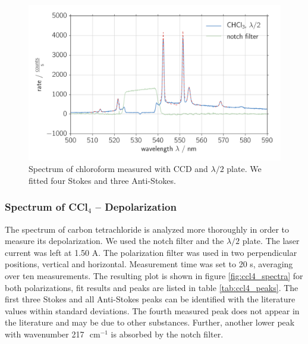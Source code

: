 \begin{figure}[htpb]
    \centering
    \includegraphics[width=0.8\linewidth]{analysis/figures/ccd_chcl3_spectra}
    \caption{
        Spectrum of chloroform measured with CCD and $\lambda / 2$ plate. We fitted four Stokes and 
        three Anti-Stokes. 
    }
    \label{fig:ccd_chcl3_spectra}
\end{figure}

\subsubsection{Spectrum of CCl$_4$ -- Depolarization}
The spectrum of carbon tetrachloride is analyzed more thoroughly in order to measure its depolarization. We used 
the notch filter and the $\lambda / 2$ plate. The laser current was left at 1.50 A. The polarization filter was 
used in two perpendicular positions, vertical and horizontal. Measurement time was set to 20 s, averaging over 
ten measurements. The resulting plot is shown in figure \ref{fig:ccl4_spectra} for both polarizations, fit results 
and peaks are listed in table \ref{tab:ccl4_peaks}. The first three Stokes and all Anti-Stokes peaks can be 
identified with the literature values within standard deviations. The fourth measured peak does not appear 
in the literature and may be due to other substances. Further, another lower peak with wavenumber 217
$\text{ cm}^{-1}$ is absorbed by the notch filter.

